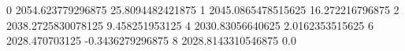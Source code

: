 0 2054.623779296875 25.8094482421875
1 2045.0865478515625 16.272216796875
2 2038.2725830078125 9.458251953125
4 2030.83056640625 2.0162353515625
6 2028.470703125 -0.3436279296875
8 2028.8143310546875 0.0
